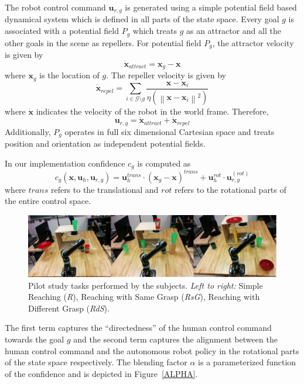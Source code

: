 \documentclass[conference]{IEEEtran}
\newcommand{\norm}[1]{\left\lVert#1\right\rVert}
\begin{document}
The robot control command $\boldsymbol{u}_{r,g}$ is generated using a simple potential field based dynamical system which is defined in all parts of the state space. Every goal $g$ is associated with a potential field $P_g$ which treats $g$ as an attractor and all the other goals in the scene as repellers. For potential field $P_g$, the attractor velocity is given by
\begin{equation*}
\dot{\boldsymbol{x}}_{attract} = \boldsymbol{x}_{g} - \boldsymbol{x}
\end{equation*}
where $\boldsymbol{x}_{g}$ is the location of $g$. The repeller velocity is given by
\begin{equation*}
\dot{\boldsymbol{x}}_{repel} = \sum_{i \in \mathcal{G} \setminus g} \frac{\boldsymbol{x} - \boldsymbol{x}_{i}}{\eta(\norm{\boldsymbol{x} - \boldsymbol{x}_{i}}^2)}
\end{equation*}
where $\dot{\boldsymbol{x}}$ indicates the velocity of the robot in the world frame. Therefore, 
\begin{equation*}
\boldsymbol{u}_{r,g} = \dot{\boldsymbol{x}}_{attract} + \dot{\boldsymbol{x}}_{repel} 
\end{equation*}
Additionally, $P_g$ operates in full six dimensional Cartesian space and treats position and orientation as independent potential fields. 

In our implementation confidence $c_g$ is computed as
\begin{equation}\label{E1}
c_g(\boldsymbol{x}, \boldsymbol{u}_h, \boldsymbol{u}_{r,g}) = \boldsymbol{u}_{h}^{trans}\cdot(\boldsymbol{x}_{g} - \boldsymbol{x})^{trans} + \boldsymbol{u}_h^{rot}\cdot\boldsymbol{u}_{r,g}^{(rot)}
\end{equation}
where $trans$ refers to the translational and $rot$ refers to the rotational parts of the entire control space. 
\begin{figure}[ht]
	\centering
	\includegraphics[width = 1\hsize]{./figures/TASKS.png}
	\caption{Pilot study tasks performed by the subjects. \textit{Left to right:} Simple Reaching (\textit{R}), Reaching with Same Grasp (\textit{RsG}), Reaching with Different Grasp (\textit{RdS}).}
	\label{TASKS}
\end{figure}
The first term captures the ``directedness'' of the human control command towards the goal $g$ and the second term captures the alignment between the human control command and the autonomous robot policy in the rotational parts of the state space respectively. 
The blending factor $\alpha$ is a parameterized function of the confidence and is depicted in Figure~\ref{ALPHA}.
 
\end{document}

